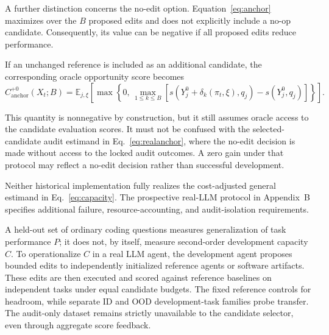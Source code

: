 \documentclass[11pt,a4paper]{article}
\begin{document}
A further distinction concerns the no-edit option. Equation~\eqref{eq:anchor} maximizes over the
$B$ proposed edits and does not explicitly include a no-op candidate. Consequently, its value can be
negative if all proposed edits reduce performance.

If an unchanged reference is included as an additional candidate, the corresponding oracle opportunity score becomes
\[
C_{\mathrm{anchor}}^{+0}(X_t;B)
=
\mathbb{E}_{j,\xi}
\left[
\max\left\{
0,\,
\max_{1\leq k\leq B}
\left[
s(Y_j^0+\delta_k(\pi_t,\xi),q_j)
-
s(Y_j^0,q_j)
\right]
\right\}
\right].
\]

This quantity is nonnegative by construction, but it still assumes oracle access to the candidate evaluation scores. It must not be confused with the selected-candidate audit estimand in Eq.~\eqref{eq:realanchor}, where the no-edit decision is made without access to the locked audit outcomes. A zero gain under that protocol may reflect a no-edit decision rather than successful development.

Neither historical implementation fully realizes the cost-adjusted general estimand in Eq.~\eqref{eq:capacity}. The prospective real-LLM protocol in Appendix~B specifies additional failure, resource-accounting, and audit-isolation requirements.

A held-out set of ordinary coding questions measures generalization of task performance $P$; it does not, by itself, measure second-order development capacity $C$. To operationalize $C$ in a real LLM agent, the development agent proposes bounded edits to independently initialized reference agents or software artifacts. These edits are then executed and scored against reference baselines on independent tasks under equal candidate budgets. The fixed reference controls for headroom, while separate ID and OOD development-task families probe transfer. The audit-only dataset remains strictly unavailable to the candidate selector, even through aggregate score feedback.\par
\end{document}
